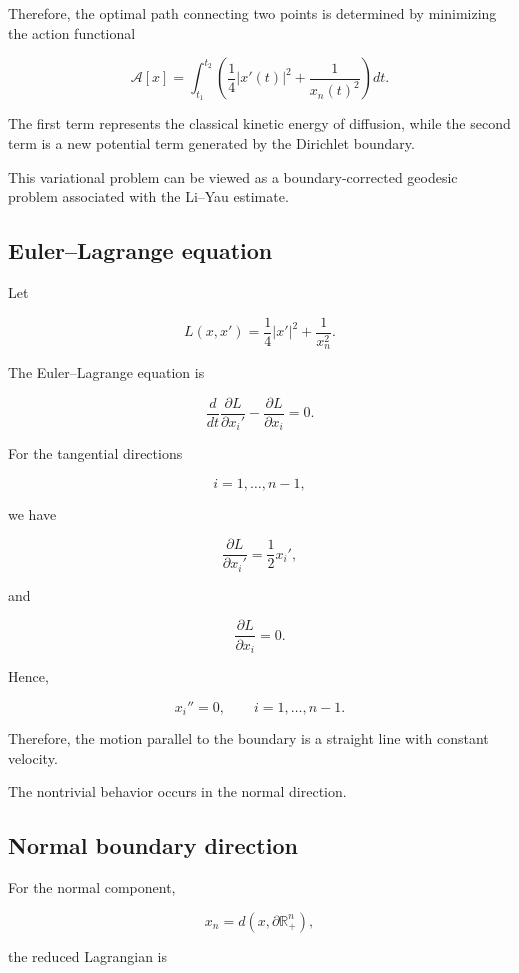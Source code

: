 \documentclass[11pt]{amsart}
\theoremstyle{definition}
\theoremstyle{remark}
\begin{document}
Therefore, the optimal path connecting two points is determined by
minimizing the action functional

\[
\mathcal A[x]
=
\int_{t_1}^{t_2}
\left(
\frac14 |x'(t)|^2
+
\frac1{x_n(t)^2}
\right)dt .
\]


The first term represents the classical kinetic energy of diffusion,
while the second term is a new potential term generated by the
Dirichlet boundary.

This variational problem can be viewed as a boundary-corrected
geodesic problem associated with the Li--Yau estimate.



\subsection{Euler--Lagrange equation}


Let

\[
L(x,x')
=
\frac14|x'|^2+\frac1{x_n^2}.
\]


The Euler--Lagrange equation is

\[
\frac{d}{dt}
\frac{\partial L}{\partial x_i'}
-
\frac{\partial L}{\partial x_i}
=0.
\]


For the tangential directions

\[
i=1,\ldots,n-1,
\]

we have

\[
\frac{\partial L}{\partial x_i'}
=
\frac12 x_i',
\]

and

\[
\frac{\partial L}{\partial x_i}=0 .
\]

Hence,

\[
\boxed{
x_i''=0,
\qquad i=1,\ldots,n-1 .
}
\]


Therefore, the motion parallel to the boundary is a straight line
with constant velocity.

The nontrivial behavior occurs in the normal direction.



\subsection{Normal boundary direction}


For the normal component,

\[
x_n=d(x,\partial\mathbb R^n_+),
\]

the reduced Lagrangian is
\end{document}
